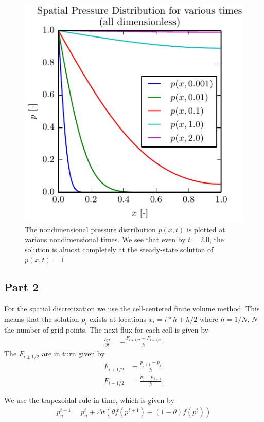 \documentclass{article}
\begin{document}
\begin{figure}[!ht]
    \centering
    \includegraphics[scale=1.0]{p_over_time.pdf}
    \caption{The nondimensional pressure distribution $p(x,t)$ is plotted at various nondimensional times.
    We see that even by $t=2.0$, the solution is almost completely at the steady-state solution of $p(x,t) = 1$.}
    \label{fig:p_analytic}
\end{figure}

\subsection{Part 2}
For the spatial discretization we use the cell-centered finite volume method.
This means that the solution $p_i$ exists at locations $x_i = i*h + h/2$ where $h = 1/N$, $N$ the number of grid points.
The next flux for each cell is given by
\begin{align}
    \frac{\partial p}{\partial t} = -\frac{F_{i+1/2} - F_{i-1/2}}{h}.
\end{align}
The $F_{i \pm 1/2}$ are in turn given by
\begin{align}
    F_{i + 1/2} &= \frac{p_{j+1} - p_j}{h} \\
    F_{i - 1/2} &= \frac{p_{j} - p_{j-1}}{h}.
\end{align}

We use the trapezoidal rule in time, which is given by
\begin{align}
   p_n^{t+1} = p_n^{t} + \Delta t \left( \theta f(p^{t+1}) + (1 - \theta) f(p^{t}) \right)
\end{align}
\end{document}
